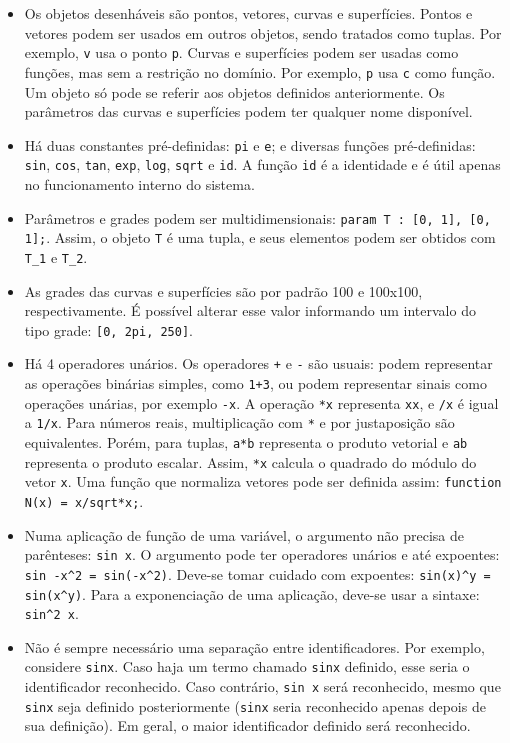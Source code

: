 \begin{itemize}
\item
Os objetos desenháveis são pontos, vetores, curvas e superfícies.
Pontos e vetores podem ser usados em outros objetos, sendo tratados como tuplas.
Por exemplo, \texttt{v} usa o ponto \texttt{p}.
Curvas e superfícies podem ser usadas como funções, mas sem a restrição no domínio.
Por exemplo, \texttt{p} usa \texttt{c} como função.
Um objeto só pode se referir aos objetos definidos anteriormente.
Os parâmetros das curvas e superfícies podem ter qualquer nome disponível.

\item
Há duas constantes pré-definidas: \texttt{pi} e \texttt{e};
e diversas funções pré-definidas:
\texttt{sin}, \texttt{cos}, \texttt{tan},
\texttt{exp}, \texttt{log}, \texttt{sqrt} e \texttt{id}.
A função \texttt{id} é a identidade e é útil apenas no funcionamento interno do sistema.

\item
Parâmetros e grades podem ser multidimensionais:
\texttt{param T : [0, 1], [0, 1];}. Assim, o objeto \texttt{T} é uma tupla,
e seus elementos podem ser obtidos com \texttt{T\_1} e \texttt{T\_2}.

\item As grades das curvas e superfícies são por padrão 100 e 100x100, respectivamente.
É possível alterar esse valor informando um intervalo do
tipo grade: \texttt{[0, 2pi, 250]}.

\item
Há 4 operadores unários. Os operadores \texttt{+} e \texttt{-} são usuais:
podem representar as operações binárias simples, como \texttt{1+3}, ou podem
representar sinais como operações unárias, por exemplo \texttt{-x}.
A operação \texttt{*x} representa \texttt{xx}, e \texttt{/x} é igual a \texttt{1/x}.
Para números reais, multiplicação com \texttt{*} e por justaposição são equivalentes.
Porém, para tuplas, \texttt{a*b} representa o produto vetorial
e \texttt{ab} representa o produto escalar.
Assim, \texttt{*x} calcula o quadrado do módulo do vetor \texttt{x}.
Uma função que normaliza vetores pode ser
definida assim: \texttt{function N(x) = x/sqrt*x;}.

\item
Numa aplicação de função de uma variável, o argumento não precisa de parênteses:
\texttt{sin x}.
O argumento pode ter operadores unários e até expoentes:
\texttt{sin -x\textasciicircum2 = sin(-x\textasciicircum2)}.
Deve-se tomar cuidado com expoentes:
\texttt{sin(x)\textasciicircum y = sin(x\textasciicircum y)}.
Para a exponenciação de uma aplicação,
deve-se usar a sintaxe: \texttt{sin\textasciicircum2 x}.

\item
Não é sempre necessário uma separação entre identificadores.
Por exemplo, considere \texttt{sinx}.
Caso haja um termo chamado \texttt{sinx} definido, esse seria o
identificador reconhecido.
Caso contrário, \texttt{sin x} será reconhecido,
mesmo que \texttt{sinx} seja definido posteriormente
(\texttt{sinx} seria reconhecido apenas depois de sua definição).
Em geral, o maior identificador definido será reconhecido.
\end{itemize}

